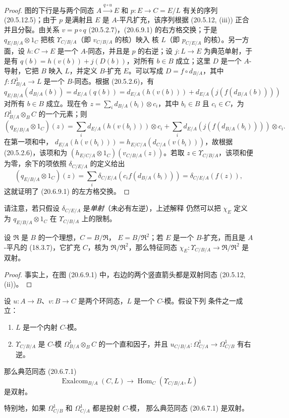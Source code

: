 \begin{proof}
图的下行是与两个同态 $A\xrightarrow{q\circ u}E$ 和
$p:E\to C=E/L$ 有关的序列 (20.5.12.5)；由于 $p$ 是满射且 $E$ 是
$A$-平凡扩充，该序列根据 (20.5.12, (iii)) 正合并且分裂。由关系
$v=p\circ q$ (20.5.2.7)，(20.6.9.1) 的右方格交换；于是
$q_{E/B/A}\otimes1_C$ 把核 $\Upsilon_{C/B/A}$（即 $v_{C/B/A}$ 的核）映入
核 $L$（即 $p_{C/E/A}$ 的核）。另一方面，设 $h:C\to E$ 是一个
$A$-同态，并且是 $p$ 的右逆；设 $j:L\to E$ 为典范单射，于是有
$q(b)=h(v(b))+j(D(b))$，对所有 $b\in B$ 成立；这里 $D$ 是一个
$A$-导射，它把 $B$ 映入 $L$，并定义 $B$-扩充 $E$。可以写成
$D=f\circ d_{B/A}$，其中
$f:\Omega^1_{B/A}\to L$ 是一个 $B$-同态。根据 (20.5.2.6)，有
\[
  q_{E/B/A}(d_{B/A}(b))=d_{E/A}(q(b))
  =d_{E/A}(h(v(b)))+d_{E/A}(j(f(d_{B/A}(b))))
\]
对所有 $b\in B$ 成立。现在令
$z=\sum_i d_{B/A}(b_i)\otimes c_i$，其中 $b_i\in B$ 且 $c_i\in C$，为
$\Omega^1_{B/A}\otimes_B C$ 的一个元素；则
\[
  (q_{E/B/A}\otimes1_C)(z)=
  \sum_i d_{E/A}(h(v(b_i)))\otimes c_i+
  \sum_i d_{E/A}(j(f(d_{B/A}(b_i))))\otimes c_i.
\]
在第一项和中，
$d_{E/A}(h(v(b_i)))=h_{E/C/A}(d_{C/A}(v(b_i)))$，故根据
(20.5.2.6)，该项和为
$(h_{E/C/A}\otimes1_C)(v_{C/B/A}(z))$。若取
$z\in\Upsilon_{C/B/A}$，该项和便为零，余下的项依照
$\delta_{C/E/A}$ 的定义给出
\[
  (q_{E/B/A}\otimes1_C)(z)=
  \sum_i\delta_{C/E/A}(c_i f(d_{B/A}(b_i)))
  =\delta_{C/E/A}(f(z)),
\]
这就证明了 (20.6.9.1) 的左方格交换。
\end{proof}

请注意，若只假设 $\delta_{C/E/A}$ 是\emph{单射}（未必有左逆），上述解释
仍然可以把 $\chi_E$ 定义为 $q_{E/B/A}\otimes1_C$ 在
$\Upsilon_{C/B/A}$ 上的限制。

\begin{corollary}[20.6.10]
\label{0.20.6.10-fr}
设 $\mathfrak{R}$ 是 $B$ 的一个理想，$C=B/\mathfrak{R}$，
$E=B/\mathfrak{R}^2$；若 $E$ 是一个 $B$-扩充，而且是 $A$-平凡的
(18.3.7)，它扩充 $C$，核为 $\mathfrak{R}/\mathfrak{R}^2$，那么特征同态
$\chi_E:\Upsilon_{C/B/A}\to\mathfrak{R}/\mathfrak{R}^2$ 是双射。
\end{corollary}

\begin{proof}
事实上，在图 (20.6.9.1) 中，右边的两个竖直箭头都是双射同态
(20.5.12, (ii))。
\end{proof}

\begin{theorem}[20.6.11]
\label{0.20.6.11-fr}
设 $u:A\to B$、$v:B\to C$ 是两个环同态，$L$ 是一个 $C$-模。假设下列
条件之一成立：
\begin{enumerate}
  \item[\rm(i)] $L$ 是一个内射 $C$-模。
  \item[\rm(ii)] $\Upsilon_{C/B/A}$ 是 $C$-模
$\Omega^1_{B/A}\otimes_B C$ 的一个直和因子，并且
$u_{C/B/A}:\Omega^1_{C/A}\to\Omega^1_{C/B}$ 有右逆。
\end{enumerate}
那么典范同态 (20.6.7.1)
\[
  \operatorname{Exalcom}_{B/A}(C,L)\longrightarrow
  \operatorname{Hom}_C(\Upsilon_{C/B/A},L)
\]
是双射。

特别地，如果 $\Omega^1_{C/B}$ 和 $\Omega^1_{C/A}$ 都是投射 $C$-模，
那么典范同态 (20.6.7.1) 是双射。
\end{theorem}

